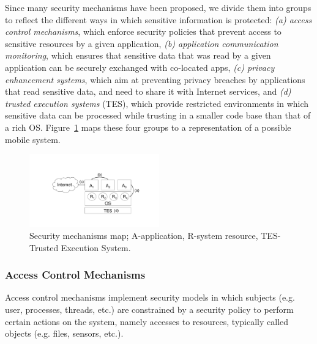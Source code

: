 Since many security mechanisms have been proposed, we divide them into groups to reflect the different ways in which sensitive information is protected: \emph{(a) access control mechanisms}, which enforce security policies that prevent access to sensitive resources by a given application, \emph{(b) application communication monitoring}, which ensures that sensitive data that was read by a given application can be securely exchanged with co-located apps, \emph{(c) privacy enhancement systems}, which aim at preventing privacy breaches by applications that read sensitive data, and need to share it with Internet services, and \emph{(d) trusted execution systems} (TES), which provide restricted environments in which sensitive data can be processed while trusting in a smaller code base than that of a rich OS. Figure~\ref{fig:relwork} maps these four groups to a representation of a possible mobile system.

\begin{figure}[t!]
	\centering
	\includegraphics[width=0.50\textwidth]{img/relwork.pdf}
	\caption{Security mechanisms map; A-application, R-system resource, TES-Trusted Execution System.}
	\label{fig:relwork}
\end{figure}

\subsubsection{Access Control Mechanisms}
\label{sec:accesscontrol}

Access control mechanisms implement security models in which subjects (e.g. user, processes, threads, etc.) are constrained by a security policy to perform certain actions on the system, namely accesses to resources, typically called objects (e.g. files, sensors, etc.).

